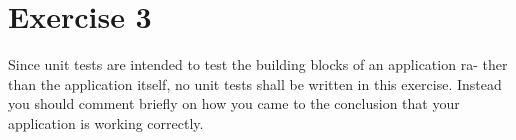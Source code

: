 \chapter{Exercise 3}

Since unit tests are intended to test the building blocks of an application ra-
ther than the application itself, no unit tests shall be written in this exercise.
Instead you should comment briefly on how you came to the conclusion that
your application is working correctly.